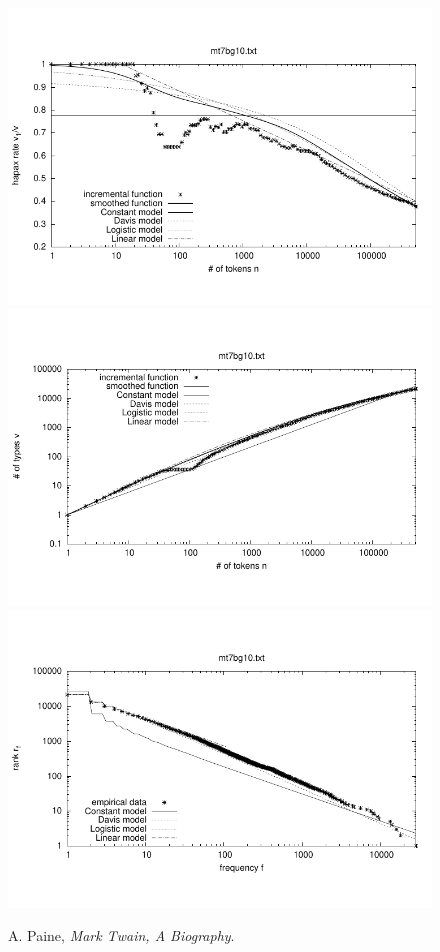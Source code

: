 \documentclass[a4paper,12pt]{article}
\begin{document}

\begin{figure}[p]
  \centering
  \vspace{-2em}
  \includegraphics[width=0.8\columnwidth]{output/herdan/mt7bg10_27/token_ratio.pdf}
  \\[-3em]
  \includegraphics[width=0.8\columnwidth]{output/herdan/mt7bg10_27/token_type.pdf}
  \\[-3em]
  \includegraphics[width=0.8\columnwidth]{output/herdan/mt7bg10_27/frequency_rank.pdf}
  \vspace{-2em}
  \caption{A. Paine, \emph{Mark Twain, A Biography}.\label{figmt7bg10F}}
\end{figure}
\end{document}

